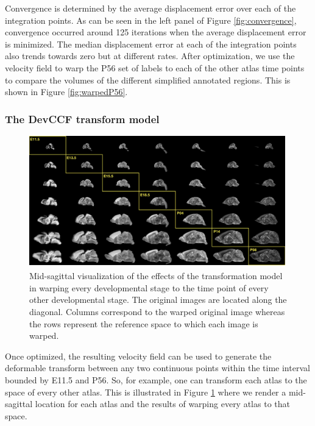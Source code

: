 \documentclass[
  12pt,
]{article}
\begin{document}
Convergence is determined by the average displacement error over each of
the integration points. As can be seen in the left panel of Figure
\ref{fig:convergence}, convergence occurred around 125 iterations when
the average displacement error is minimized. The median displacement
error at each of the integration points also trends towards zero but at
different rates. After optimization, we use the velocity field to warp
the P56 set of labels to each of the other atlas time points to compare
the volumes of the different simplified annotated regions. This is shown
in Figure \ref{fig:warpedP56}.

\hypertarget{the-devccf-transform-model}{%
\subsubsection*{The DevCCF transform
model}\label{the-devccf-transform-model}}

\begin{figure}[!htb]
\centering
\includegraphics[width=0.99\textwidth]{Figures/CrossWarp.pdf}
\caption{Mid-sagittal visualization of the effects of the transformation model in
warping every developmental stage to the time point of every other developmental
stage.  The original images are located along the diagonal.  Columns correspond
to the warped original image whereas the rows represent the reference space to which
each image is warped.}
\label{fig:crosswarp}
\end{figure}

Once optimized, the resulting velocity field can be used to generate the
deformable transform between any two continuous points within the time
interval bounded by E11.5 and P56. So, for example, one can transform
each atlas to the space of every other atlas. This is illustrated in
Figure \ref{fig:crosswarp} where we render a mid-sagittal location for
each atlas and the results of warping every atlas to that space.
\end{document}
